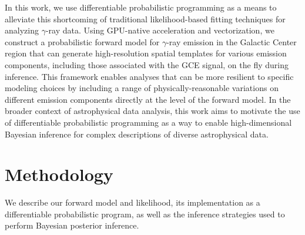 \documentclass[prd,aps,10pt,nofootinbib,twocolumn,superscriptaddress,preprintnumbers,balancelastpage,longbibliography,floatfix]{revtex4-2}
\begin{document}
In this work, we use differentiable probabilistic programming as a means to alleviate this shortcoming of traditional likelihood-based fitting techniques for analyzing $\gamma$-ray data. Using GPU-native acceleration and vectorization, we construct a probabilistic forward model for $\gamma$-ray emission in the Galactic Center region that can generate high-resolution spatial templates for various emission components, including those associated with the GCE signal, on the fly during inference. This framework enables analyses that can be more resilient to specific modeling choices by including a range of physically-reasonable variations on different emission components directly at the level of the forward model. In the broader context of astrophysical data analysis, this work aims to motivate the use of differentiable probabilistic programming as a way to enable high-dimensional Bayesian inference for complex descriptions of diverse astrophysical data.


\vspace{0.05in}    

\section{Methodology} 
\label{sec:methodology}

We describe our forward model and likelihood, its implementation as a differentiable probabilistic program, as well as the inference strategies used to perform Bayesian posterior inference.
\end{document}
